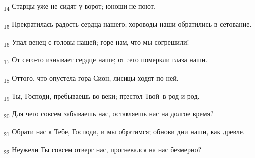 \begin{tcolorbox}
\textsubscript{14} Старцы уже не сидят у ворот; юноши не поют.
\end{tcolorbox}
\begin{tcolorbox}
\textsubscript{15} Прекратилась радость сердца нашего; хороводы наши обратились в сетование.
\end{tcolorbox}
\begin{tcolorbox}
\textsubscript{16} Упал венец с головы нашей; горе нам, что мы согрешили!
\end{tcolorbox}
\begin{tcolorbox}
\textsubscript{17} От сего-то изнывает сердце наше; от сего померкли глаза наши.
\end{tcolorbox}
\begin{tcolorbox}
\textsubscript{18} Оттого, что опустела гора Сион, лисицы ходят по ней.
\end{tcolorbox}
\begin{tcolorbox}
\textsubscript{19} Ты, Господи, пребываешь во веки; престол Твой--в род и род.
\end{tcolorbox}
\begin{tcolorbox}
\textsubscript{20} Для чего совсем забываешь нас, оставляешь нас на долгое время?
\end{tcolorbox}
\begin{tcolorbox}
\textsubscript{21} Обрати нас к Тебе, Господи, и мы обратимся; обнови дни наши, как древле.
\end{tcolorbox}
\begin{tcolorbox}
\textsubscript{22} Неужели Ты совсем отверг нас, прогневался на нас безмерно?
\end{tcolorbox}
